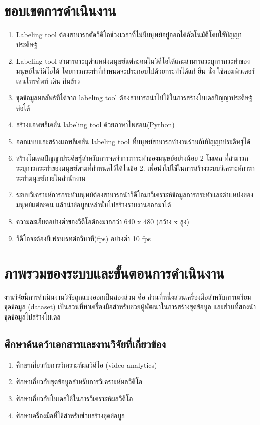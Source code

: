 \section{ขอบเขตการดำเนินงาน}
\begin{enumerate}
	\setlength\itemsep{-0.25em}
	\item Labeling tool ต้องสามารถตัดวิดิโอช่วงเวลาที่ไม่มีมนุษย์อยู่ออกได้อัตโนมัติโดยใช้ปัญญาประดิษฐ์
	\item Labeling tool สามารถระบุตำแหน่งมนุษย์แต่ละคนในวิดีโอได้และสามารถระบุการกระทำของมนุษย์ในวิดีโอได้ 
	โดยการกระทำที่กำหนดจะประกอบไปด้วยกระทำได้แก่ ยืน นั่ง ใช้คอมพิวเตอร์ เล่นโทรศัพท์ เดิน กินข้าว 
	\item ชุดข้อมูลผลลัพธ์ที่ได้จาก labeling tool ต้องสามารถนำไปใช้ในการสร้างโมเดลปัญญาประดิษฐ์ต่อได้
	\item สร้างแอพพลิเคชั่น labeling tool ด้วยภาษาไพธอน(Python)
	\item ออกแบบและสร้างแอพลิเคชั่น labeling tool ที่มนุษย์สามารถทำงานร่วมกับปัญญาประดิษฐ์ได้
	\item สร้างโมเดลปัญญาประดิษฐ์สำหรับการจดจำการกระทำของมนุษย์อย่างน้อย 2 โมเดล ที่สามารถระบุการกระทำของมนุษย์ตามที่กำหนดไว้ได้ในข้อ 2. 
	เพื่อนำไปใช้ในการสร้างระบบวิเคราะห์การกระทำมนุษย์ภายในสำนักงาน
	\item ระบบวิเคราะห์การกระทำมนุษย์ต้องสามารถนำวิดีโอมาวิเคราะห์ข้อมูลการกระทำและตำแหน่งของมนุษย์แต่ละคน แล้วนำข้อมูลเหล่านั้นไปสร้างรายงานออกมาได้
	\item ความละเอียดอย่างต่ำของวิดีโอต้องมากกว่า 640 x 480 (กว้าง x สูง)
	\item วิดีโอจะต้องมีเฟรมเรทต่อวินาที(fps) อย่างต่ำ 10 fps
\end{enumerate}

\section{ภาพรวมของระบบและขั้นตอนการดำเนินงาน}
งานวิจัยนี้การดำเนินงานวิจัยถูกแบ่งออกเป็นสองส่วน คือ ส่วนที่หนึ่งส่วนเครื่องมือสำหรับการเตรียมชุดข้อมูล (dataset) เป็นส่วนที่ทำเครื่องมือสำหรับช่วยผู้พัฒนาในการสร้างชุดข้อมูล และส่วนที่สองนำชุดข้อมูลไปสร้างโมเดล
\subsection*{ศึกษาค้นคว้าเอกสารและงานวิจัยที่เกี่ยวข้อง}
\begin{enumerate}\setlength\itemsep{-0.25em}
	\item ศึกษาเกี่ยวกับการวิเคราะห์ผลวิดิโอ (video analytics)
	\item ศึกษาเกี่ยวกับชุดข้อมูลสำหรับการวิเคราะห์ผลวิดิโอ
	\item ศึกษาเกี่ยวกับโมเดลใช้ในการวิเคราะห์ผลวิดิโอ
	\item ศึกษาเครื่องมือที่ใช้สำหรับช่วยสร้างชุดข้อมูล
\end{enumerate}

